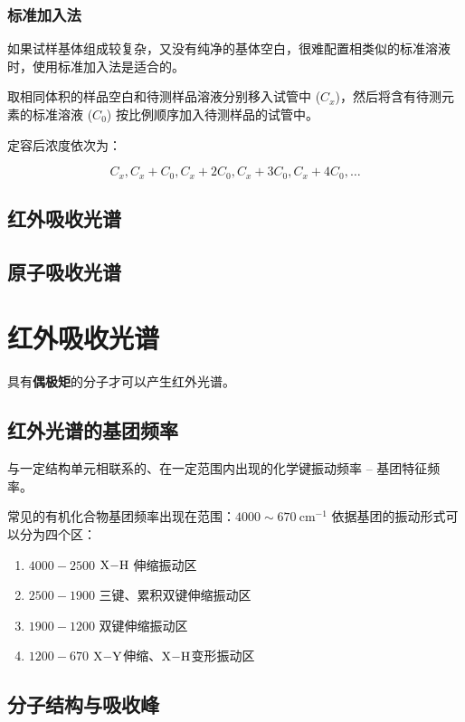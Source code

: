 \subsubsection{标准加入法}

如果试样基体组成较复杂，又没有纯净的基体空白，很难配置相类似的标准溶液时，使用标准加入法是适合的。

取相同体积的样品空白和待测样品溶液分别移入试管中 ($C_x$)，然后将含有待测元素的标准溶液 ($C_0$) 按比例顺序加入待测样品的试管中。

定容后浓度依次为：

\begin{equation}
    C_x, C_x + C_0, C_x + 2C_0, C_x + 3C_0, C_x + 4C_0, \dots
\end{equation}

\subsection{红外吸收光谱}

\subsection{原子吸收光谱}

\section{红外吸收光谱}

具有\textbf{偶极矩}的分子才可以产生红外光谱。

\subsection{红外光谱的基团频率}

与一定结构单元相联系的、在一定范围内出现的化学键振动频率 -- 基团特征频率。

常见的有机化合物基团频率出现在范围：$4000 \sim 670 \ \mathrm{cm}^{-1}$ 依据基团的振动形式可以分为四个区：

\begin{enumerate}
    \item $4000 - 2500$ $\ce{X-H}$ 伸缩振动区
    \item $2500 - 1900$ 三键、累积双键伸缩振动区
    \item $1900 - 1200$ 双键伸缩振动区
    \item $1200 - 670$ $\ce{X-Y}$伸缩、$\ce{X-H}$变形振动区
\end{enumerate}


\subsection{分子结构与吸收峰}


